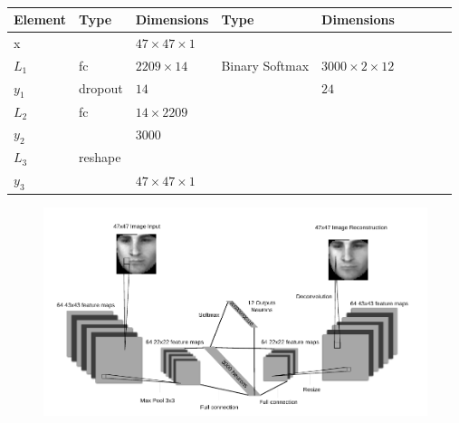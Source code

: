     \begin{table}[h!]
    \centering
    {\footnotesize
    \begin{tabular}{|lllllllll|}
    \hline
    \multicolumn{1}{|l|}{Element} & Type     & \multicolumn{1}{l|}{Dimensions}                     & Type     & \multicolumn{1}{l|}{Dimensions}                      \\ \hline
    \multicolumn{1}{|l|}{x}       &          & \multicolumn{1}{l|}{$47\times47\times1$}            &          & \multicolumn{1}{l|}{}                                \\ \hline
    \multicolumn{1}{|l|}{$L_1$}   & fc       & \multicolumn{1}{l|}{$2209\times14$}              & Binary Softmax & \multicolumn{1}{l|}{$3000\times2\times12$}        \\
    \multicolumn{1}{|l|}{$y_1$}   & dropout  & \multicolumn{1}{l|}{$14$}                         &          & \multicolumn{1}{l|}{$24$}                              \\ \hline
    \multicolumn{1}{|l|}{$L_2$}   & fc       & \multicolumn{1}{l|}{$14\times2209$}              &          & \multicolumn{1}{l|}{}                                   \\
    \multicolumn{1}{|l|}{$y_2$}   &          & \multicolumn{1}{l|}{$3000$}                         &          & \multicolumn{1}{l|}{}                                \\ \hline
    \multicolumn{1}{|l|}{$L_3$}   & reshape & \multicolumn{1}{l|}{}                    &          & \multicolumn{1}{l|}{}                                \\
    \multicolumn{1}{|l|}{$y_3$}   &          & \multicolumn{1}{l|}{$47\times47\times 1$}          &          & \multicolumn{1}{l|}{}                                \\ \hline
    \end{tabular}

    \caption{} \label{net:simple1}

    }
    \end{table}

    \begin{figure}[h!]
     \centering
     \includegraphics[width=\textwidth]{illustrations/aec_network.pdf}
    \end{figure}

